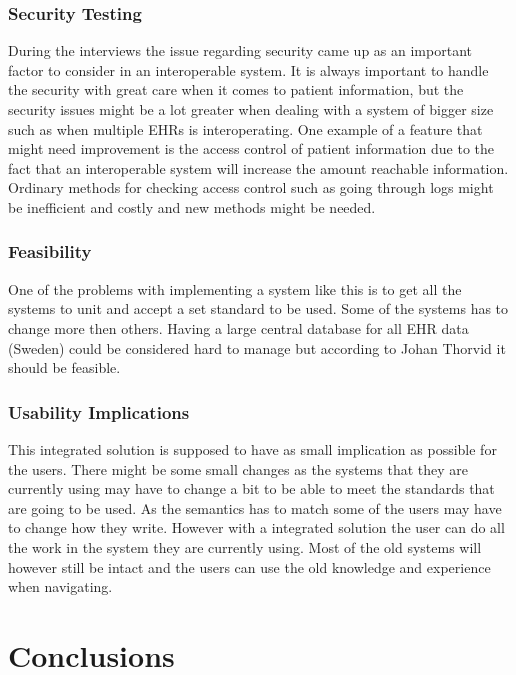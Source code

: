 \documentclass[14pt]{article}
\begin{document}
\subsubsection{Security Testing}
During the interviews the issue regarding security came up as an important factor to consider in an interoperable system. It is always important to handle the security with great care when it comes to patient information, but the security issues might be a lot greater when dealing with a system of bigger size such as when multiple \glspl{EHR} is interoperating. One example of a feature that might need improvement is the access control of patient information due to the fact that an interoperable system will increase the amount reachable information. Ordinary methods for checking access control such as going through logs might be inefficient and costly and new methods might be needed.

\subsubsection{Feasibility}
One of the problems with implementing a system like this is to get all the systems to unit and accept a set standard to be used. Some of the systems has to change more then others.
Having a large central database for all \gls{EHR} data (Sweden) could be considered hard to manage but according to Johan Thorvid it should be feasible.

\subsubsection{Usability Implications}
This integrated solution is supposed to have as small implication as possible for the users. There might be some small changes as the systems that they are currently using may have to change a bit to be able to meet the standards that are going to be used. As the semantics has to match some of the users may have to change how they write. However with a integrated solution the user can do all the work in the system they are currently using. Most of the old systems will however still be intact and the users can use the old knowledge and experience when navigating.

\newpage

\section{Conclusions}
\label{sec:Conclusions}



\newpage
\printglossaries
\newpage

\begin{appendix}
\end{appendix}



 
 
\end{document}
